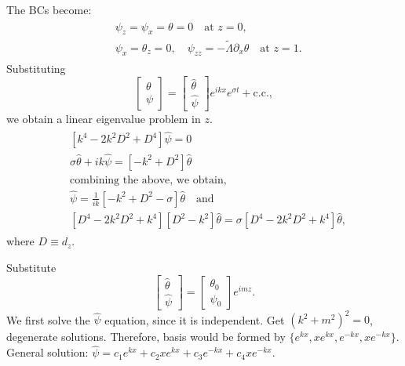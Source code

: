 \documentclass{article}
\begin{document}
The BCs become:
\begin{align}
\label{eq:perturbation_bcs}
 \begin{split}
  &\boxed{ \psi_{z} = \psi_{x} = \theta = 0} \quad \textrm{at } z = 0,  \\
  & \boxed{ \psi_{x} = \theta_{z} = 0, \quad \psi_{zz} = -\tilde{\Lambda} \partial_{x}\theta} \quad \textrm{at } z = 1. 
 \end{split}
\end{align}
%
Substituting
\begin{equation}
 \begin{bmatrix}
    \theta \\
     \psi
 \end{bmatrix} = \begin{bmatrix}
    \hat{\theta} \\
     \hat{\psi}
 \end{bmatrix}e^{ikx}e^{\sigma t} + \textrm{c.c.}, 
\end{equation}
%
we obtain a linear eigenvalue problem in $z$.
\begin{align}
 \begin{split}
  & [k^{4} - 2k^{2}D^{2} + D^{4}] \hat{\psi} = 0\\
  & \sigma \hat{\theta} + ik \hat{\psi} = [-k^{2}+D^{2}]\hat{\theta}\\
  & \textrm{combining the above, we obtain},\\
  &\boxed{ \hat{\psi} = \frac{1}{ik} [-k^{2}+D^{2} - \sigma]\hat{\theta} }\quad \textrm{and}\\
  & \boxed{ [D^{4} - 2k^{2}D^{2} + k^{4}][D^{2}-k^{2}]\hat{\theta} = \sigma [D^{4} - 2k^{2}D^{2} + k^{4}] \hat{\theta} },
 \end{split}
\end{align}
%
where $D \equiv d_{z}$. 

Substitute 
\begin{equation}
 \begin{bmatrix}
    \hat{\theta} \\
     \hat{\psi}
 \end{bmatrix} = \begin{bmatrix}
     \theta_{0}\\
     \psi_{0}     
 \end{bmatrix}e^{imz}. 
\end{equation}
We first solve the $\hat{\psi}$ equation, since it is independent. 
Get $(k^{2}+m^{2})^{2} = 0$, degenerate solutions. Therefore, basis would be formed by $\{e^{kx}, xe^{kx}, e^{-kx}, xe^{-kx}\}$. General solution: $\hat{\psi} = c_{1}e^{kx} + c_{2} xe^{kx} + c_{3} e^{-kx}+ c_{4} xe^{-kx}$. 
\end{document}

